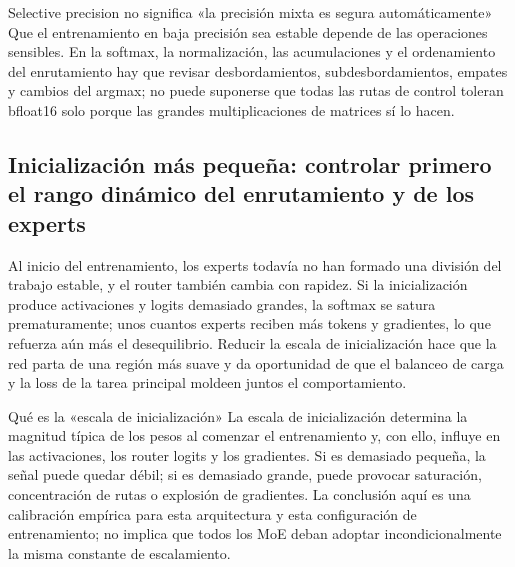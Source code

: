 \begin{warningbox}{Selective precision no significa «la precisión mixta es segura automáticamente»}
Que el entrenamiento en baja precisión sea estable depende de las operaciones sensibles. En la softmax, la normalización, las acumulaciones y el ordenamiento del enrutamiento hay que revisar desbordamientos, subdesbordamientos, empates y cambios del argmax; no puede suponerse que todas las rutas de control toleran bfloat16 solo porque las grandes multiplicaciones de matrices sí lo hacen.
\end{warningbox}

\subsection{Inicialización más pequeña: controlar primero el rango dinámico del enrutamiento y de los experts}

Al inicio del entrenamiento, los experts todavía no han formado una división del trabajo estable, y el router también cambia con rapidez. Si la inicialización produce activaciones y logits demasiado grandes, la softmax se satura prematuramente; unos cuantos experts reciben más tokens y gradientes, lo que refuerza aún más el desequilibrio. Reducir la escala de inicialización hace que la red parta de una región más suave y da oportunidad de que el balanceo de carga y la loss de la tarea principal moldeen juntos el comportamiento.



\begin{knowledgebox}{Qué es la «escala de inicialización»}
La escala de inicialización determina la magnitud típica de los pesos al comenzar el entrenamiento y, con ello, influye en las activaciones, los router logits y los gradientes. Si es demasiado pequeña, la señal puede quedar débil; si es demasiado grande, puede provocar saturación, concentración de rutas o explosión de gradientes. La conclusión aquí es una calibración empírica para esta arquitectura y esta configuración de entrenamiento; no implica que todos los MoE deban adoptar incondicionalmente la misma constante de escalamiento.
\end{knowledgebox}

